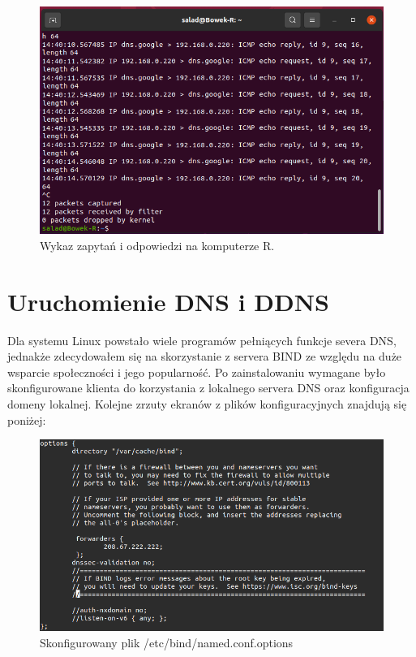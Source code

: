 \documentclass{article}
\begin{document}
\begin{figure}[H]
    \centering
    \includegraphics[scale = 0.5]{NAT/nat4.png}  
    \caption{Wykaz zapytań i odpowiedzi na komputerze R.}
    \label{2}
\end{figure}
\newpage

\section{Uruchomienie DNS i DDNS }

Dla systemu Linux powstało wiele programów pełniących funkcje severa DNS, jednakże zdecydowałem się na skorzystanie z servera BIND ze względu na duże wsparcie społeczności i jego popularność. Po zainstalowaniu wymagane było skonfigurowane klienta do korzystania z lokalnego servera DNS oraz konfiguracja domeny lokalnej. Kolejne zrzuty ekranów z plików konfiguracyjnych znajdują się poniżej:

\begin{figure}[H]
    \centering
    \includegraphics[scale = 0.45]{DNS/1D5i9Yw.png}  
    \caption{Skonfigurowany plik /etc/bind/named.conf.options}
    \label{2}
\end{figure}
\end{document}
